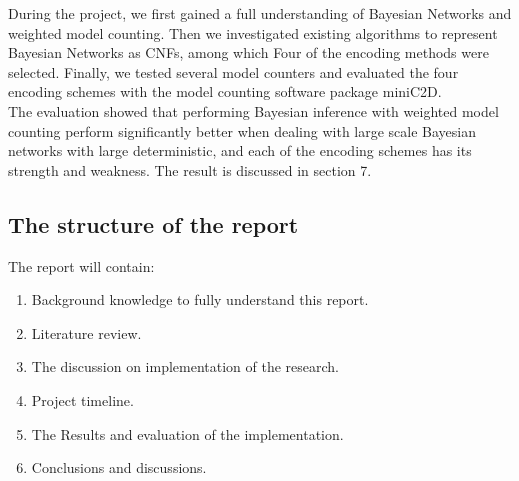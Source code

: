     \noindent During the project, we first gained a full understanding of Bayesian Networks and weighted model counting. Then we investigated existing algorithms to represent Bayesian Networks as CNFs, among which Four of the encoding methods were selected. Finally, we tested several model counters and evaluated the four encoding schemes with the model counting software package miniC2D.\\
    
    \noindent The evaluation showed that performing Bayesian inference with weighted model counting perform significantly better when dealing with large scale Bayesian networks with large deterministic, and each of the encoding schemes has its strength and weakness. The result is discussed in section 7. 
    
    

    \subsection{The structure of the report}
    The report will contain:
    \begin{enumerate}
        \item Background knowledge to fully understand this report.
        \item Literature review.
        \item The discussion on implementation of the research.
        \item Project timeline.
        \item The Results and evaluation of the implementation.
        \item Conclusions and discussions.
    \end{enumerate}

\newpage